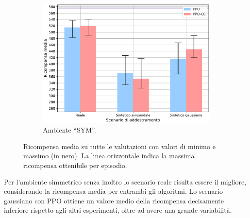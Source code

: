 \begin{figure}
    \begin{subfigure}{.65\textwidth}
        \centering
        \includegraphics[width=\linewidth]{assets/5/results/eval_SYM_summary_reward.pdf}
        \caption{Ambiente ``SYM''.}
    \end{subfigure}
    
    \caption[Ricompensa media nelle valutazioni]{Ricompensa media su tutte le valutazioni con valori di minimo e massimo (in nero). La linea orizzontale indica la massima ricompensa ottenibile per episodio.}
    \label{fig:5_results_reward}
\end{figure}

Per l'ambiente simmetrico senza inoltro lo scenario reale risulta essere il migliore, considerando la ricompensa media per entrambi gli algoritmi. Lo scenario gaussiano con PPO ottiene un valore medio della ricompensa decisamente inferiore rispetto agli altri esperimenti, oltre ad avere una grande variabilità.




